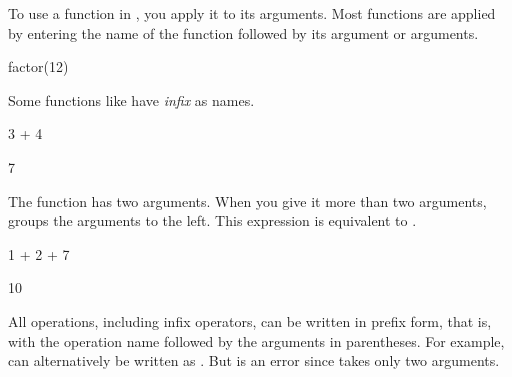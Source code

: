 To use a function in \Language{}, you apply it to its arguments.
Most functions are applied by entering the name of the function followed by
its argument or arguments.
\begin{xtc}
\begin{xtccomment}
\end{xtccomment}
\begin{spadsrc}
factor(12)
\end{spadsrc}
\begin{TeXOutput}
\begin{fricasmath}{1}
%
\end{fricasmath}
\end{TeXOutput}
\end{xtc}
%
\begin{xtc}
\begin{xtccomment}
Some functions like \spadop{+} have {\it infix}  as names.
\end{xtccomment}
\begin{spadsrc}
3 + 4
\end{spadsrc}
\begin{TeXOutput}
\begin{fricasmath}{2}
7%
\end{fricasmath}
\end{TeXOutput}
\end{xtc}
\begin{xtc}
\begin{xtccomment}
The function \spadop{+} has two arguments.
When you give it more than two arguments,
\Language{} groups the arguments to the left.
This expression is equivalent to .
\end{xtccomment}
\begin{spadsrc}
1 + 2 + 7
\end{spadsrc}
\begin{TeXOutput}
\begin{fricasmath}{3}
10%
\end{fricasmath}
\end{TeXOutput}
\end{xtc}

All operations, including infix operators, can be written in prefix form,
that is, with the operation name followed by the arguments
in parentheses.
For example,  can alternatively be written as .
But  is an error since \spadop{+}
takes only two arguments.

